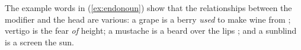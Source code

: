 The example words in (\ref{ex:endonoun}) show that the relationships between 
the modifier and the head are various: a grape is a berry \emph{used} to 
make wine from \parencite[compare][702]{bauer2001}; vertigo is the fear 
\emph{of} height; a mustache is a beard  over the lips 
\parencite[702]{bauer2001}; and a sunblind is a screen  the 
sun.
